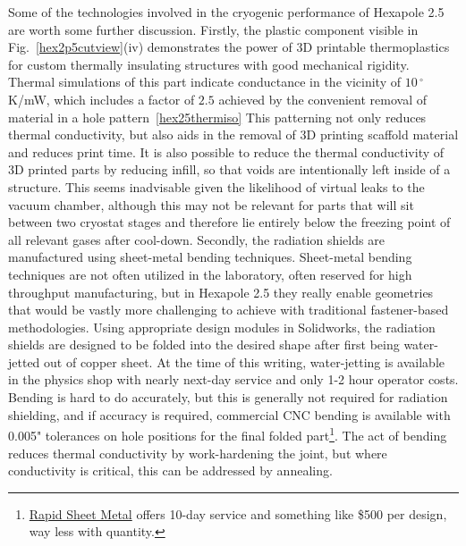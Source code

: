 Some of the technologies involved in the cryogenic performance of Hexapole 2.5 are worth some further discussion.
Firstly, the plastic component visible in Fig.~\ref{hex2p5cutview}(iv) demonstrates the power of 3D printable thermoplastics for custom thermally insulating structures with good mechanical rigidity.
Thermal simulations of this part indicate conductance in the vicinity of $10\,^\circ$K/mW, which includes a factor of $2.5$ achieved by the convenient removal of material in a hole pattern~\ref{hex25thermiso}
This patterning not only reduces thermal conductivity, but also aids in the removal of 3D printing scaffold material and reduces print time.
It is also possible to reduce the thermal conductivity of 3D printed parts by reducing infill, so that voids are intentionally left inside of a structure.
This seems inadvisable given the likelihood of virtual leaks to the vacuum chamber, although this may not be relevant for parts that will sit between two cryostat stages and therefore lie entirely below the freezing point of all relevant gases after cool-down.
Secondly, the radiation shields are manufactured using sheet-metal bending techniques.
Sheet-metal bending techniques are not often utilized in the laboratory, often reserved for high throughput manufacturing, but in Hexapole 2.5 they really enable geometries that would be vastly more challenging to achieve with traditional fastener-based methodologies.
Using appropriate design modules in Solidworks, the radiation shields are designed to be folded into the desired shape after first being water-jetted out of copper sheet.
At the time of this writing, water-jetting is available in the physics shop with nearly next-day service and only 1-2 hour operator costs.
Bending is hard to do accurately, but this is generally not required for radiation shielding, and if accuracy is required, commercial CNC bending is available with 0.005" tolerances on hole positions for the final folded part\footnote{\href{https://rapidmanufacturing.com/rapid-sheet-metal/}{Rapid Sheet Metal} offers 10-day service and something like \$500 per design, way less with quantity.}.
The act of bending reduces thermal conductivity by work-hardening the joint, but where conductivity is critical, this can be addressed by annealing.




